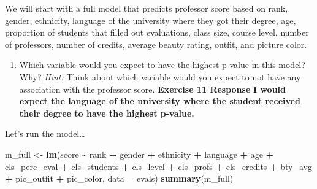 \documentclass[
]{article}
\newenvironment{Shaded}{\begin{snugshade}}{\end{snugshade}}
\newcommand{\AttributeTok}[1]{\textcolor[rgb]{0.13,0.29,0.53}{#1}}
\newcommand{\FunctionTok}[1]{\textcolor[rgb]{0.13,0.29,0.53}{\textbf{#1}}}
\newcommand{\NormalTok}[1]{#1}
\newcommand{\OtherTok}[1]{\textcolor[rgb]{0.56,0.35,0.01}{#1}}
\newcommand{\SpecialCharTok}[1]{\textcolor[rgb]{0.81,0.36,0.00}{\textbf{#1}}}
\providecommand{\tightlist}{%
  \setlength{\itemsep}{0pt}\setlength{\parskip}{0pt}}
\begin{document}
We will start with a full model that predicts professor score based on
rank, gender, ethnicity, language of the university where they got their
degree, age, proportion of students that filled out evaluations, class
size, course level, number of professors, number of credits, average
beauty rating, outfit, and picture color.

\begin{enumerate}
\def\labelenumi{\arabic{enumi}.}
\setcounter{enumi}{10}
\tightlist
\item
  Which variable would you expect to have the highest p-value in this
  model? Why? \emph{Hint:} Think about which variable would you expect
  to not have any association with the professor score. \textbf{Exercise
  11 Response} \textbf{I would expect the language of the university
  where the student received their} \textbf{degree to have the highest
  p-value.}
\end{enumerate}

Let's run the model\ldots{}

\begin{Shaded}
\begin{Highlighting}[]
\NormalTok{m\_full }\OtherTok{\textless{}{-}} \FunctionTok{lm}\NormalTok{(score }\SpecialCharTok{\textasciitilde{}}\NormalTok{ rank }\SpecialCharTok{+}\NormalTok{ gender }\SpecialCharTok{+}\NormalTok{ ethnicity }\SpecialCharTok{+}\NormalTok{ language }\SpecialCharTok{+}\NormalTok{ age }\SpecialCharTok{+}\NormalTok{ cls\_perc\_eval }
             \SpecialCharTok{+}\NormalTok{ cls\_students }\SpecialCharTok{+}\NormalTok{ cls\_level }\SpecialCharTok{+}\NormalTok{ cls\_profs }\SpecialCharTok{+}\NormalTok{ cls\_credits }\SpecialCharTok{+}\NormalTok{ bty\_avg }
             \SpecialCharTok{+}\NormalTok{ pic\_outfit }\SpecialCharTok{+}\NormalTok{ pic\_color, }\AttributeTok{data =}\NormalTok{ evals)}
\FunctionTok{summary}\NormalTok{(m\_full)}
\end{Highlighting}
\end{Shaded}
\end{document}
